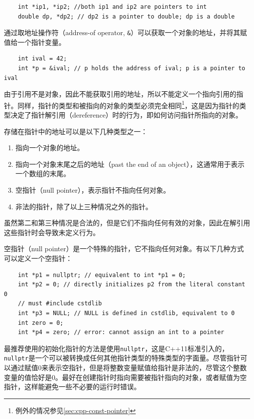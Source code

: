 \begin{verbatim}
    int *ip1, *ip2; //both ip1 and ip2 are pointers to int
    double dp, *dp2; // dp2 is a pointer to double; dp is a double
\end{verbatim}

通过取地址操作符（address-of operator, \texttt{&}）可以获取一个对象的地址，并将其赋值给一个指针变量。

\begin{verbatim}
    int ival = 42;
    int *p = &ival; // p holds the address of ival; p is a pointer to ival
\end{verbatim}

由于引用不是对象，因此不能获取引用的地址，所以不能定义一个指向引用的指针。同样，指针的类型和被指向的对象的类型必须完全相同\footnote{例外的情况参见\ref{sec:cpp-const-pointer}}，这是因为指针的类型决定了指针解引用（dereference）时的行为，即如何访问指针所指向的对象。

存储在指针中的地址可以是以下几种类型之一：

\begin{enumerate}
    \item 指向一个对象的地址。
    \item 指向一个对象末尾之后的地址（past the end of an object），这通常用于表示一个数组的末尾。
    \item 空指针（null pointer），表示指针不指向任何对象。
    \item 非法的指针，除了以上三种情况之外的指针。
\end{enumerate}

虽然第二和第三种情况是合法的，但是它们不指向任何有效的对象，因此在解引用这些指针时会导致未定义行为。

空指针（null pointer）是一个特殊的指针，它不指向任何对象。有以下几种方式可以定义一个空指针：

\begin{verbatim}
    int *p1 = nullptr; // equivalent to int *p1 = 0;
    int *p2 = 0; // directly initializes p2 from the literal constant 0
    // must #include cstdlib
    int *p3 = NULL; // NULL is defined in cstdlib, equivalent to 0
    int zero = 0;
    int *p4 = zero; // error: cannot assign an int to a pointer
\end{verbatim}

最推荐使用的初始化指针的方法是使用\texttt{nullptr}，这是C++11标准引入的，\texttt{nullptr}是一个可以被转换成任何其他指针类型的特殊类型的字面量。尽管指针可以通过赋值0来表示空指针，但是将整数变量赋值给指针是非法的，尽管这个整数变量的值恰好是0。最好在创建指针时指向需要被指针指向的对象，或者赋值为空指针，这样能避免一些不必要的运行时错误。

